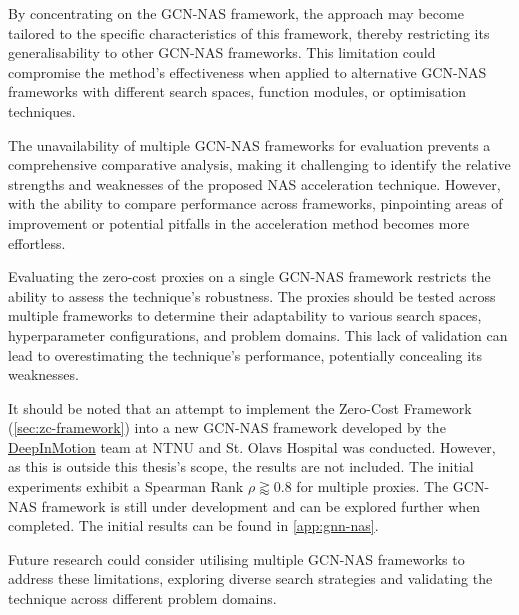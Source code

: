 By concentrating on the \gls{GCN}-\gls{NAS} framework, the approach may become tailored to the specific characteristics of this framework, thereby restricting its generalisability to other \gls{GCN}-\gls{NAS} frameworks. This limitation could compromise the method's effectiveness when applied to alternative \gls{GCN}-\gls{NAS} frameworks with different search spaces, function modules, or optimisation techniques.


The unavailability of multiple \gls{GCN}-\gls{NAS} frameworks for evaluation prevents a comprehensive comparative analysis, making it challenging to identify the relative strengths and weaknesses of the proposed \gls{NAS} acceleration technique. However, with the ability to compare performance across frameworks, pinpointing areas of improvement or potential pitfalls in the acceleration method becomes more effortless. 

Evaluating the zero-cost proxies on a single \gls{GCN}-\gls{NAS} framework restricts the ability to assess the technique's robustness. The proxies should be tested across multiple frameworks to determine their adaptability to various search spaces, hyperparameter configurations, and problem domains. This lack of validation can lead to overestimating the technique's performance, potentially concealing its weaknesses.

It should be noted that an attempt to implement the Zero-Cost Framework (\cref{sec:zc-framework}) into a new \gls{GCN}-\gls{NAS} framework developed by the \href{https://www.ntnu.edu/inb/deepinmotion}{DeepInMotion} team at \gls{NTNU} and St. Olavs Hospital was conducted. However, as this is outside this thesis's scope, the results are not included. The initial experiments exhibit a Spearman Rank $ \rho \gtrapprox 0.8$ for multiple proxies. The \gls{GCN}-\gls{NAS} framework is still under development and can be explored further when completed. The initial results can be found in \cref{app:gnn-nas}. 

Future research could consider utilising multiple \gls{GCN}-\gls{NAS} frameworks to address these limitations, exploring diverse search strategies and validating the technique across different problem domains. 
